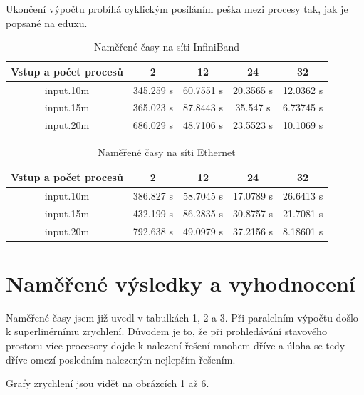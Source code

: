 \documentclass[12pt]{article}
\begin{document}
Ukončení výpočtu probíhá cyklickým posíláním peška mezi procesy tak, jak je popsané na eduxu.

\begin{table}[ht]
\begin{center}
\begin{tabular}{c|c|c|c|c}
  Vstup a počet procesů & 2 & 12 & 24 & 32 \\
  \hline
  input.10m & 345.259 s & 60.7551 s & 20.3565 s & 12.0362 s \\
  input.15m & 365.023 s & 87.8443 s & 35.547 s & 6.73745 s \\
  input.20m & 686.029 s & 48.7106 s & 23.5523 s & 10.1069 s \\
\end{tabular}
\end{center}
\caption{Naměřené časy na síti InfiniBand}
\end{table}

\begin{table}[ht]
\begin{center}
\begin{tabular}{c|c|c|c|c}
  Vstup a počet procesů & 2 & 12 & 24 & 32 \\
  \hline
  input.10m & 386.827 s & 58.7045 s & 17.0789 s & 26.6413 s \\
  input.15m & 432.199 s & 86.2835 s & 30.8757 s & 21.7081 s \\
  input.20m & 792.638 s & 49.0979 s & 37.2156 s & 8.18601 s \\
\end{tabular}
\end{center}
\caption{Naměřené časy na síti Ethernet}
\end{table}


\section{Naměřené výsledky a vyhodnocení}

Naměřené časy jsem již uvedl v tabulkách 1, 2 a 3. Při paralelním výpočtu došlo k superlinérnímu zrychlení. Důvodem je to, že při prohledávání stavového prostoru více procesory dojde k nalezení řešení mnohem dříve a úloha se tedy dříve omezí posledním nalezeným nejlepším řešením.

Grafy zrychlení jsou vidět na obrázcích 1 až 6.
\end{document}
